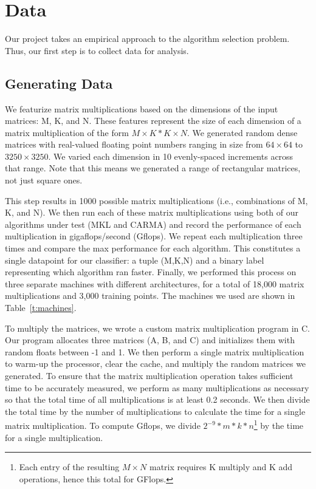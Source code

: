 \section{Data}
\label{s:data}

Our project takes an empirical approach to the algorithm selection problem.
Thus, our first step is to collect data for analysis.

\subsection{Generating Data}
\label{s:data:gen}
We featurize matrix multiplications based on the dimensions of the input matrices: M, K, and N.
These features represent the size of each dimension of a matrix multiplication of the form $M\times{K} * K\times{N}$.
We generated random dense matrices with real-valued floating point numbers ranging in size from $64\times{64}$ to $3250\times{3250}$.
We varied each dimension in 10 evenly-spaced increments across that range.
Note that this means we generated a range of rectangular matrices, not just square ones.

This step results in 1000 possible matrix multiplications (i.e., combinations of M, K, and N).
We then run each of these matrix multiplications using both of our algorithms under test (MKL and CARMA) and record the performance of each multiplication in gigaflops/second (Gflops).
We repeat each multiplication three times and compare the max performance for each algorithm.
This constitutes a single datapoint for our classifier: a tuple (M,K,N) and a binary label representing which algorithm ran faster.
Finally, we performed this process on three separate machines with different architectures, for a total of 18,000 matrix multiplications and 3,000 training points.
The machines we used are shown in Table~\ref{t:machines}.

To multiply the matrices, we wrote a custom matrix multiplication program in C.
Our program allocates three matrices (A, B, and C) and initializes them with random floats between -1 and 1.
We then perform a single matrix multiplication to warm-up the processor, clear the cache, and multiply the random matrices we generated.
To ensure that the matrix multiplication operation takes sufficient time to be accurately measured, we perform as many multiplications as necessary so that the total time of all multiplications is at least 0.2 seconds.
We then divide the total time by the number of multiplications to calculate the time for a single matrix multiplication.
To compute Gflops, we divide $2^{-9} * m * k * n$\footnote{Each entry of the resulting $M\times{N}$ matrix requires K multiply and K add operations, hence this total for GFlops.} by the time for a single multiplication.

